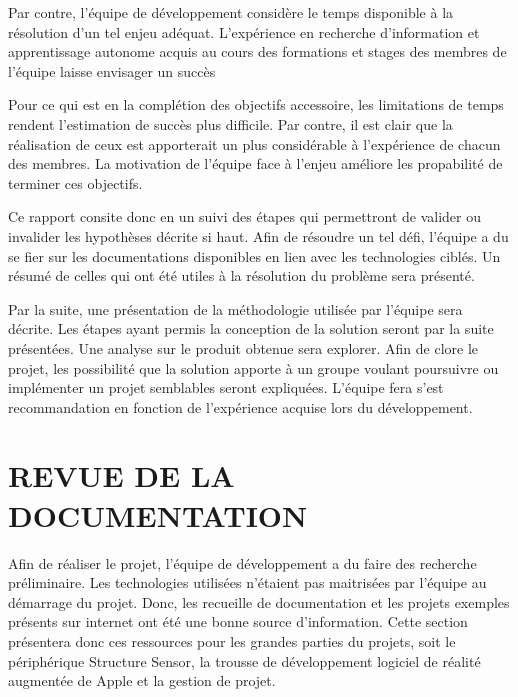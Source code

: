 \documentclass[letterpaper,twoside,12pt,french]{report}
\begin{document}
Par contre, l'équipe de développement considère le temps disponible à la résolution d'un tel enjeu
adéquat. L'expérience en recherche d'information et apprentissage autonome acquis au cours des
formations et stages des membres de l'équipe laisse envisager un succès
\par
Pour ce qui est en la complétion des objectifs accessoire, les limitations de temps rendent
l'estimation de succès plus difficile. Par contre, il est clair que la réalisation de ceux est
apporterait un plus considérable à l'expérience de chacun des membres. La motivation de l'équipe
face à l'enjeu améliore les propabilité de terminer ces objectifs.
\par
Ce rapport consite donc en un suivi des étapes qui permettront de valider ou invalider les
hypothèses décrite si haut. Afin de résoudre un tel défi, l'équipe a du se fier sur les
documentations disponibles en lien avec les technologies ciblés. Un résumé de celles qui ont été
utiles à la résolution du problème sera présenté.
\par
Par la suite, une présentation de la méthodologie utilisée par l'équipe sera décrite. Les étapes
ayant permis la conception de la solution seront par la suite présentées. Une analyse sur le produit
obtenue sera explorer. Afin de clore le projet, les possibilité que la solution apporte à un groupe voulant poursuivre ou
implémenter un projet semblables seront expliquées. L'équipe fera s'est recommandation en fonction
de l'expérience acquise lors du développement.
\chapter*{\uppercase{Revue de la documentation}}
Afin de réaliser le projet, l'équipe de développement a du faire des recherche préliminaire. Les
technologies utilisées n'étaient pas maitrisées par l'équipe au démarrage du projet. Donc, les
recueille de documentation et les projets exemples présents sur internet ont été une bonne source
d'information. Cette section présentera donc ces ressources pour les grandes parties du projets,
soit le périphérique Structure Sensor, la trousse de développement logiciel de réalité augmentée de
Apple et la gestion de projet.
\end{document}
